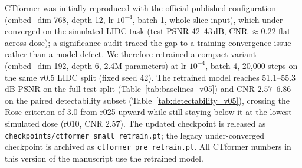 \documentclass[twoside,11pt]{article}
\begin{document}
CTformer was initially reproduced with the official published configuration (embed\_dim 768, depth 12, lr $10^{-4}$, batch 1, whole-slice input), which under-converged on the simulated LIDC task (test PSNR 42--43\,dB, CNR $\approx 0.22$ flat across dose); a significance audit traced the gap to a training-convergence issue rather than a model defect. We therefore retrained a compact variant (embed\_dim 192, depth 6, 2.4M parameters) at lr $10^{-4}$, batch 4, 20{,}000 steps on the same v0.5 LIDC split (fixed seed 42). The retrained model reaches 51.1--55.3\,dB PSNR on the full test split (Table~\ref{tab:baselines_v05}) and CNR $2.57$--$6.86$ on the paired detectability subset (Table~\ref{tab:detectability_v05}), crossing the Rose criterion of 3.0 from r025 upward while still staying below it at the lowest simulated dose (r010, CNR $2.57$). The updated checkpoint is released as \texttt{checkpoints/ctformer\_small\_retrain.pt}; the legacy under-converged checkpoint is archived as \texttt{ctformer\_pre\_retrain.pt}. All CTformer numbers in this version of the manuscript use the retrained model.
\end{document}
